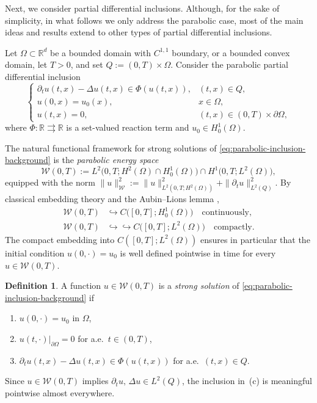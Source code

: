 \documentclass[11pt]{elsarticle}
\theoremstyle{definition}
\newtheorem{definition}[theorem]{Definition}
\theoremstyle{remark}
\numberwithin{equation}{section}
\begin{document}
Next, we consider partial differential inclusions. Although, for the sake of simplicity, in what follows we only address the parabolic case, most of the main ideas and results extend to other types of partial differential inclusions. 

Let $\Omega\subset\mathbb{R}^d$ be a bounded domain with $C^{1,1}$ boundary, or a bounded convex domain, let $T>0$, and set
$Q:=(0,T)\times\Omega$.  Consider the parabolic partial differential
inclusion
\begin{equation}\label{eq:parabolic-inclusion-background}
	\left\{
	\begin{array}{ll}
		\partial_t u(t,x)-\Delta u(t,x)\in\Phi(u(t,x)), & (t,x)\in Q,\\[4pt]
		u(0,x)=u_0(x), & x\in\Omega,\\[4pt]
		u(t,x)=0, & (t,x)\in(0,T)\times\partial\Omega,
	\end{array}
	\right.
\end{equation}
where $\Phi:\mathbb{R}\rightrightarrows\mathbb{R}$ is a set-valued reaction
term and $u_0\in H_0^1(\Omega)$.

The natural functional framework for strong solutions of
\eqref{eq:parabolic-inclusion-background} is the \emph{parabolic energy
space}
\[
\mathcal{W}(0,T)
:=
L^2\bigl(0,T;H^2(\Omega)\cap H_0^1(\Omega)\bigr)
\cap
H^1\bigl(0,T;L^2(\Omega)\bigr),
\]
equipped with the norm
$\|u\|_{\mathcal{W}}^2:=\|u\|_{L^2(0,T;H^2(\Omega))}^2
+\|\partial_t u\|_{L^2(Q)}^2$.  By classical embedding theory and the
Aubin--Lions lemma \cite{LionsMagenes},
\begin{align*}
	\mathcal{W}(0,T)&\hookrightarrow C\bigl([0,T];H_0^1(\Omega)\bigr)
	\quad\text{continuously,}\\
	\mathcal{W}(0,T)&\hookrightarrow\hookrightarrow C\bigl([0,T];L^2(\Omega)\bigr)
	\quad\text{compactly.}
\end{align*}
The compact embedding into $C([0,T];L^2(\Omega))$ ensures in particular
that the initial condition $u(0,\cdot)=u_0$ is well defined pointwise in
time for every $u\in\mathcal{W}(0,T)$.

\begin{definition}\label{def:strong-solution-pde}
	A function $u\in\mathcal{W}(0,T)$ is a \emph{strong solution} of
	\eqref{eq:parabolic-inclusion-background} if
	\begin{enumerate}
		\item[\rm(a)] $u(0,\cdot)=u_0$ in $\Omega$,
		\item[\rm(b)] $u(t,\cdot)|_{\partial\Omega}=0$ for a.e.\ $t\in(0,T)$,
		\item[\rm(c)] $\partial_t u(t,x)-\Delta u(t,x)\in\Phi(u(t,x))$ for
		a.e.\ $(t,x)\in Q$.
	\end{enumerate}
	Since $u\in\mathcal{W}(0,T)$ implies $\partial_t u,\,\Delta u\in L^2(Q)$,
	the inclusion in~(c) is meaningful pointwise almost everywhere.
\end{definition}
\end{document}
